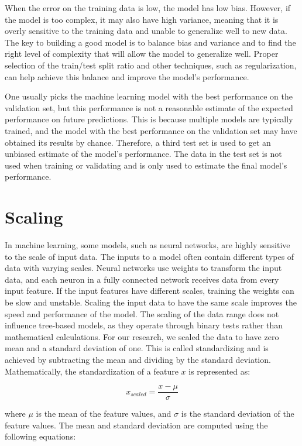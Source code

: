 When the error on the training data is low, the model has low bias.
However, if the model is too complex, it may also have high variance, meaning that it is overly sensitive to the training data and unable to generalize well to new data.
The key to building a good model is to balance bias and variance and to find the right level of complexity that will allow the model to generalize well.
Proper selection of the train/test split ratio and other techniques, such as regularization, can help achieve this balance and improve the model's performance.

One usually picks the machine learning model with the best performance on the validation set, but this performance is not a reasonable estimate of the expected performance on future predictions.
This is because multiple models are typically trained, and the model with the best performance on the validation set may have obtained its results by chance.
Therefore, a third test set is used to get an unbiased estimate of the model's performance.
The data in the test set is not used when training or validating and is only used to estimate the final model's performance.


\section{Scaling}
In machine learning, some models, such as neural networks, are highly sensitive to the scale of input data.
The inputs to a model often contain different types of data with varying scales.
Neural networks use weights to transform the input data, and each neuron in a fully connected network receives data from every input feature.
If the input features have different scales, training the weights can be slow and unstable.
Scaling the input data to have the same scale improves the speed and performance of the model.
The scaling of the data range does not influence tree-based models, as they operate through binary tests rather than mathematical calculations.
For our research, we scaled the data to have zero mean and a standard deviation of one. This is called standardizing and is achieved by subtracting the mean and dividing by the standard deviation.
Mathematically, the standardization of a feature $x$ is represented as:

\begin{equation}
x_{scaled} = \frac{x - \mu}{\sigma}
\end{equation}

where $\mu$ is the mean of the feature values, and $\sigma$ is the standard deviation of the feature values.
The mean and standard deviation are computed using the following equations:

